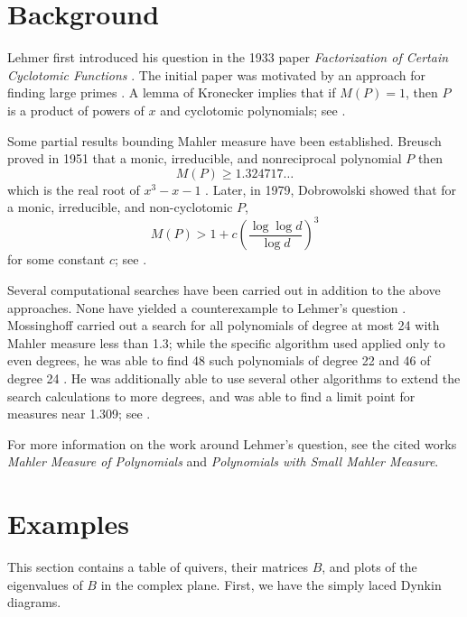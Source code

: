 \documentclass{amsart}
\theoremstyle{theorem}
\theoremstyle{theorem*}
\theoremstyle{definition}
\begin{document}
\section*{Background}

Lehmer first introduced his question in the 1933 paper \textit{Factorization of
    Certain Cyclotomic Functions} \cite{l}. The initial paper was motivated by
an approach for finding large primes \cite{ln}. A lemma of Kronecker implies
that if $M(P) = 1$, then $P$ is a product of powers of $x$ and cyclotomic
polynomials; see \cite{ln}.

Some partial results bounding Mahler measure have been established. Breusch
proved in 1951 that a monic, irreducible, and nonreciprocal polynomial $P$ then
$$M(P) \geq 1.324717\dots$$ which is the real root of $x^3 - x - 1$ \cite{ln}.
Later, in 1979, Dobrowolski showed that for a monic, irreducible, and
non-cyclotomic $P$,
$$M(P) > 1 + c \left(\frac{\log \log d}{\log d}\right)^3$$ for some constant $c$;
see \cite{ln}.

Several computational searches have been carried out in addition to the above
approaches. None have yielded a counterexample to Lehmer's question \cite{m}.
Mossinghoff carried out a search for all polynomials of degree at most 24 with
Mahler measure less than 1.3; while the specific algorithm used applied only to
even degrees, he was able to find 48 such polynomials of degree 22 and 46 of
degree 24 \cite{m}. He was additionally able to use several other algorithms to
extend the search calculations to more degrees, and was able to find a limit
point for measures near 1.309; see \cite{m}.

For more information on the work around Lehmer's question, see the cited works
\textit{Mahler Measure of Polynomials} and \textit{Polynomials with Small Mahler
    Measure}.

\section*{Examples}

This section contains a table of quivers, their matrices $B$, and plots of the
eigenvalues of $B$ in the complex plane. First, we have the simply laced Dynkin
diagrams.
\end{document}
